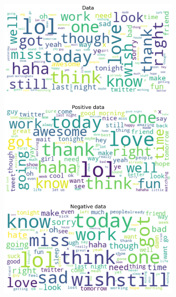 \documentclass{article}
\begin{document}
\begin{itemize}
\begin{figure}[H]
\begin{subfigure}[b]{0.24\textwidth}
      \includegraphics[width=\textwidth]{chapter-06/section-01-01/09/visualization/3/wordcloud.png}
    \end{subfigure}
    \begin{subfigure}[b]{0.24\textwidth}
      \centering

\end{subfigure}
\end{figure}
\end{itemize}
\end{document}
